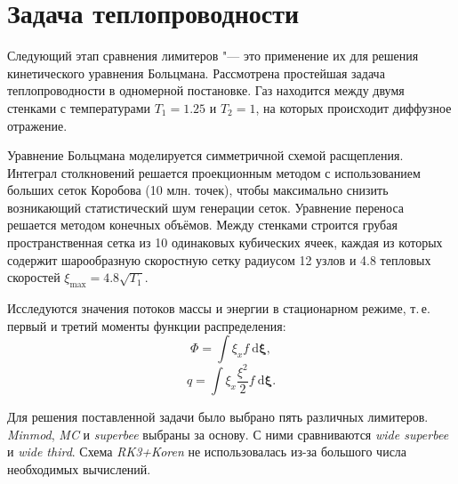 \documentclass[a4paper,10pt]{article}
\newcommand{\dd}{\:\mathrm{d}}
\begin{document}
\newpage
\section{Задача теплопроводности}
Следующий этап сравнения лимитеров "--- это применение их для решения кинетического уравнения Больцмана.
Рассмотрена простейшая задача теплопроводности в одномерной постановке.
Газ находится между двумя стенками с температурами \(T_1=1.25\) и \(T_2=1\), на которых происходит диффузное отражение.

Уравнение Больцмана моделируется симметричной схемой расщепления.
Интеграл столкновений решается проекционным методом с использованием больших сеток Коробова (10 млн. точек),
чтобы максимально снизить возникающий статистический шум генерации сеток.
Уравнение переноса решается методом конечных объёмов.
Между стенками строится грубая пространственная сетка из 10 одинаковых кубических ячеек,
каждая из которых содержит шарообразную скоростную сетку радиусом 12 узлов и 4.8 тепловых скоростей \( \xi_{\max} = 4.8\sqrt{T_1} \).

Исследуются значения потоков массы и энергии в стационарном режиме, т.\,е. первый и третий моменты функции распределения:
\[ \Phi = \int{\xi_x f \dd\boldsymbol\xi}, \]
\[ q = \int{\xi_x\frac{\xi^2}{2} f \dd\boldsymbol\xi}. \]

Для решения поставленной задачи было выбрано пять различных лимитеров.
\textit{Minmod}, \textit{MC} и \textit{superbee} выбраны за основу.
С ними сравниваются \textit{wide superbee} и \textit{wide third}.
Схема \textit{RK3+Koren} не использовалась из-за большого числа необходимых вычислений.
\end{document}
